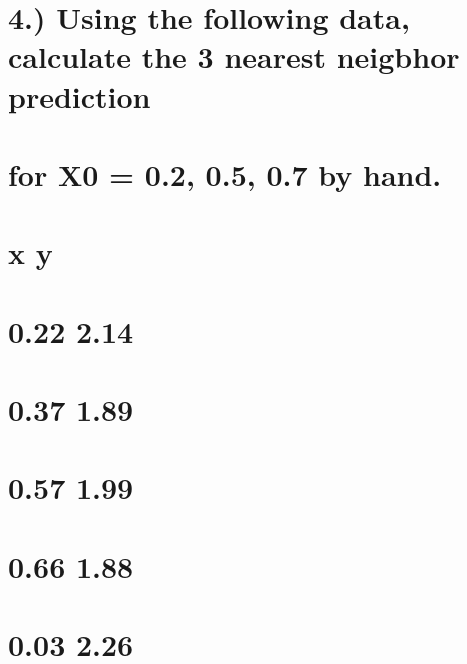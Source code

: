\documentclass[
  letterpaper,
  DIV=11,
  numbers=noendperiod]{scrreprt}
\begin{document}
{

\chapter{4.) Using the following data, calculate the 3 nearest neigbhor
prediction}\label{using-the-following-data-calculate-the-3-nearest-neigbhor-prediction}


\chapter{for X0 = 0.2, 0.5, 0.7 by
hand.}\label{for-x0-0.2-0.5-0.7-by-hand.}


\chapter{x y}\label{x-y}


\chapter{0.22 2.14}\label{section-3}


\chapter{0.37 1.89}\label{section-4}


\chapter{0.57 1.99}\label{section-5}


\chapter{0.66 1.88}\label{section-6}


\chapter{0.03 2.26}\label{section-7}

}
\end{document}
